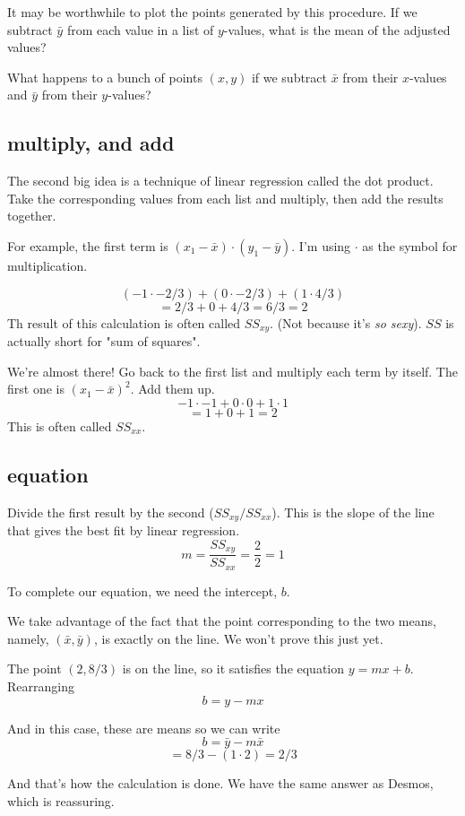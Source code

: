 \documentclass[11pt, oneside]{article}
\begin{document}
It may be worthwhile to plot the points generated by this procedure.  If we subtract $\bar{y}$ from each value in a list of $y$-values, what is the mean of the adjusted values?

What happens to a bunch of points $(x,y)$ if we subtract $\bar{x}$ from their $x$-values and $\bar{y}$ from their $y$-values?

\subsection*{multiply, and add}

The second big idea is a technique of linear regression called the dot product.  Take the corresponding values from each list and multiply, then add the results together.

For example, the first term is $(x_1 - \bar{x}) \cdot (y_1 - \bar{y})$.  I'm using $\cdot$ as the symbol for multiplication.

\[ (-1 \cdot -2/3) + (0 \cdot -2/3) + (1 \cdot 4/3) \]
\[ = 2/3 + 0 + 4/3 = 6/3 = 2 \]
Th result of this calculation  is often called $SS_{xy}$.  (Not because it's \emph{so sexy}).  $SS$ is actually short for "sum of squares".

We're almost there!  Go back to the first list and multiply each term by itself.  The first one is $(x_1 - \bar{x})^2$.  Add them up.
\[ -1 \cdot -1 + 0 \cdot 0 + 1 \cdot 1 \]
\[ = 1 + 0 + 1 = 2 \]
This is often called $SS_{xx}$.

\subsection*{equation}
Divide the first result by the second ($SS_{xy}/SS_{xx}$).  This is the slope of the line that gives the best fit by linear regression.
\[ m = \frac{SS_{xy}}{SS_{xx}} = \frac{2}{2} = 1 \]

To complete our equation, we need the intercept, $b$.

We take advantage of the fact that the point corresponding to the two means, namely, $(\bar{x},\bar{y})$, is exactly on the line.  We won't prove this just yet.

The point $(2,8/3)$ is on the line, so it satisfies the equation $y = m x + b$.  Rearranging
\[ b = y - mx \]

And in this case, these are means so we can write
\[ b = \bar{y} - m \bar{x} \]
\[ = 8/3 - (1 \cdot 2) = 2/3 \]

And that's how the calculation is done.  We have the same answer as Desmos, which is reassuring.
\end{document}
